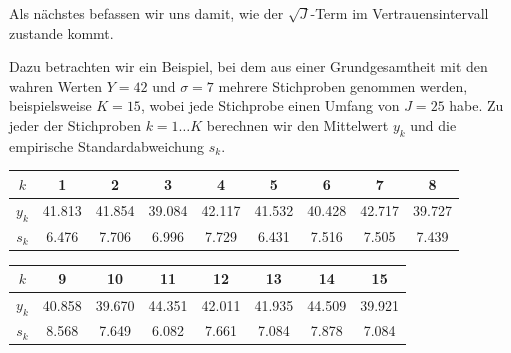 Als nächstes befassen wir uns damit, wie der $\sqrt{J}$-Term im Vertrauensintervall zustande kommt.

Dazu betrachten wir ein Beispiel, bei dem aus einer Grundgesamtheit mit den wahren
Werten $Y = 42$ und $\sigma = 7$ mehrere Stichproben genommen werden, beispielsweise $K = 15$,
wobei jede Stichprobe einen Umfang von $J = 25$ habe. Zu jeder der Stichproben $k = 1\dots K$
berechnen wir den Mittelwert $y_k$ und die empirische Standardabweichung $s_k$.

\begin{tabular}{c||c|c|c|c|c|c|c|c}
$k$   &  1     &    2   &    3   &   4    &    5   &   6    &   7    &   8   \\
\hline\hline
$y_k$ & 41.813 & 41.854 & 39.084 & 42.117 & 41.532 & 40.428 & 42.717 & 39.727\\
\hline
$s_k$ &  6.476 &  7.706 &  6.996 &  7.729 &  6.431 &  7.516 &  7.505 &  7.439\\
\end{tabular}

\vspace{3mm}

\begin{tabular}{c||c|c|c|c|c|c|c}
$k$   &  9     &    10  &   11   &   12   &   13   &   14   &   15  \\
\hline\hline
$y_k$ & 40.858 & 39.670 & 44.351 & 42.011 & 41.935 & 44.509 & 39.921\\
\hline
$s_k$ &  8.568 &  7.649 &  6.082 &  7.661 &  7.084 &  7.878 &  7.084\\
\end{tabular}

